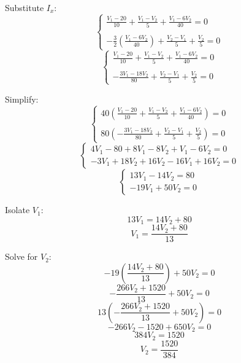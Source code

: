 \documentclass{article}
\begin{document}
			Substitute $I_x$:
				\begin{equation*}\begin{cases}
					\displaystyle \frac{V_1 - 20}{10} + \frac{V_1 - V_2}{5} + \frac{V_1 - 6V_2}{40} = 0 \\ \\
					\displaystyle -\frac{3}{2}\left(\frac{V_1 - 6V_2}{40}\right) + \frac{V_2 - V_1}{5} + \frac{V_2}{5} = 0
				\end{cases}\end{equation*}
				\begin{equation*}\begin{cases}
					\displaystyle \frac{V_1 - 20}{10} + \frac{V_1 - V_2}{5} + \frac{V_1 - 6V_2}{40} = 0 \\ \\
					\displaystyle -\frac{3V_1 - 18V_2}{80} + \frac{V_2 - V_1}{5} + \frac{V_2}{5} = 0
				\end{cases}\end{equation*}

			Simplify:
				\begin{equation*}\begin{cases}
					\displaystyle 40\left(\frac{V_1 - 20}{10} + \frac{V_1 - V_2}{5} + \frac{V_1 - 6V_2}{40}\right) = 0 \\ \\
					\displaystyle 80\left(-\frac{3V_1 - 18V_2}{80} + \frac{V_2 - V_1}{5} + \frac{V_2}{5}\right) = 0
				\end{cases}\end{equation*}
				\begin{equation*}\begin{cases}
					\displaystyle 4V_1 - 80 + 8V_1 - 8V_2 + V_1 - 6V_2 = 0 \\
					\displaystyle -3V_1 + 18V_2 + 16V_2 - 16V_1 + 16V_2 = 0
				\end{cases}\end{equation*}
				\begin{equation*}\begin{cases}
					\displaystyle 13V_1 - 14V_2 = 80 \\
					\displaystyle -19V_1 + 50V_2 = 0
				\end{cases}\end{equation*}

			Isolate $V_1$:
				\[13V_1 = 14V_2 + 80\]
				\[V_1 = \frac{14V_2 + 80}{13}\]

			Solve for $V_2$:
				\[-19\left(\frac{14V_2 + 80}{13}\right) + 50V_2 = 0\]
				\[-\frac{266V_2 + 1520}{13} + 50V_2 = 0\]
				\[13\left(-\frac{266V_2 + 1520}{13} + 50V_2\right) = 0\]
				\[-266V_2 - 1520 + 650V_2 = 0\]
				\[384V_2 = 1520\]
				\[V_2 = \frac{1520}{384}\]
\end{document}

